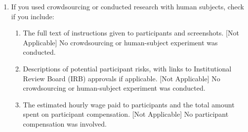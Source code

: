 \begin{enumerate}
  \item If you used crowdsourcing or conducted research with human subjects, check if you include:
  \begin{enumerate}
    \item The full text of instructions given to participants and screenshots. [Not Applicable] No crowdsourcing or human-subject experiment was conducted.
    \item Descriptions of potential participant risks, with links to Institutional Review Board (IRB) approvals if applicable. [Not Applicable] No crowdsourcing or human-subject experiment was conducted.
    \item The estimated hourly wage paid to participants and the total amount spent on participant compensation. [Not Applicable] No participant compensation was involved.
  \end{enumerate}

\end{enumerate}

\clearpage


